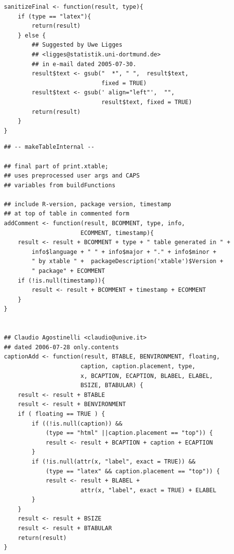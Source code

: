 \documentclass{memoir}\usepackage[]{graphicx}\usepackage[]{color}
\begin{document}
\begin{lstlisting}
sanitizeFinal <- function(result, type){
    if (type == "latex"){
        return(result)
    } else {
        ## Suggested by Uwe Ligges 
        ## <ligges@statistik.uni-dortmund.de>
        ## in e-mail dated 2005-07-30.
        result$text <- gsub("  *", " ",  result$text, 
                            fixed = TRUE)
        result$text <- gsub(' align="left"',  "", 
                            result$text, fixed = TRUE)
        return(result)
    }
}
\end{lstlisting}

\begin{lstlisting}
## -- makeTableInternal --

## final part of print.xtable; 
## uses preprocessed user args and CAPS 
## variables from buildFunctions

## include R-version, package version, timestamp 
## at top of table in commented form
addComment <- function(result, BCOMMENT, type, info, 
                      ECOMMENT, timestamp){
    result <- result + BCOMMENT + type + " table generated in " +
        info$language + " " + info$major + "." + info$minor +
        " by xtable " +  packageDescription('xtable')$Version +
        " package" + ECOMMENT
    if (!is.null(timestamp)){
        result <- result + BCOMMENT + timestamp + ECOMMENT    
    }
}


## Claudio Agostinelli <claudio@unive.it> 
## dated 2006-07-28 only.contents
captionAdd <- function(result, BTABLE, BENVIRONMENT, floating, 
                      caption, caption.placement, type, 
                      x, BCAPTION, ECAPTION, BLABEL, ELABEL, 
                      BSIZE, BTABULAR) {
    result <- result + BTABLE
    result <- result + BENVIRONMENT
    if ( floating == TRUE ) {
        if ((!is.null(caption)) &&
            (type == "html" ||caption.placement == "top")) {
            result <- result + BCAPTION + caption + ECAPTION
        }
        if (!is.null(attr(x, "label", exact = TRUE)) &&
            (type == "latex" && caption.placement == "top")) {
            result <- result + BLABEL +
                      attr(x, "label", exact = TRUE) + ELABEL
        }
    }
    result <- result + BSIZE
    result <- result + BTABULAR
    return(result)
}


\end{lstlisting}
\end{document}
